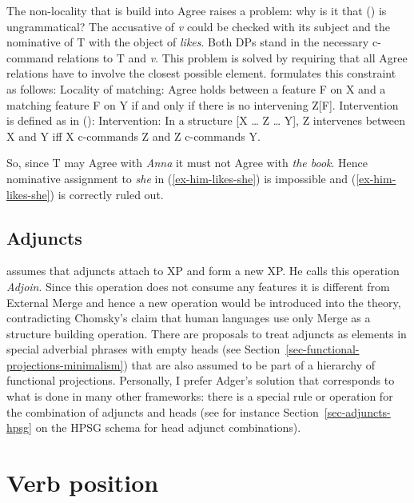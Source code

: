 The non-locality that is build into Agree raises a problem: why is it that () is
ungrammatical?
\z
The accusative of \textit{v} could be checked with its subject and the nominative of T with the
object of \emph{likes}. Both DPs stand in the necessary c-command relations to T and \textit{v}. This
problem is solved by requiring that all Agree relations have to involve the closest possible
element. \citet[]{Adger2003a} formulates this constraint as follows:
\ea
\label{principle-locality-of-matching}
Locality of matching: Agree holds between a feature F on X and a matching feature F on Y if and only
if there is no intervening Z[F].
\z
Intervention is defined as in ():
\ea
\label{def-intervention}
Intervention: In a structure [X \ldots{} Z \ldots{} Y], Z intervenes between X and Y iff X
c-commands Z and Z c-commands Y.
\z

So, since T may Agree with \emph{Anna} it must not Agree with \emph{the book}. Hence
nominative assignment to \emph{she} in (\ref{ex-him-likes-she}) is impossible and (\ref{ex-him-likes-she}) is correctly ruled out.

\subsection{Adjuncts}

\citet[Section~4.2.3]{Adger2003a} assumes that adjuncts attach to XP and form a new XP. He calls
this operation \emph{Adjoin}. Since this operation does not consume any features it is different from
External Merge and hence a new operation would be introduced into the theory, contradicting
Chomsky's claim that human languages use only Merge as a structure building operation. There are
proposals to treat adjuncts as elements in special adverbial phrases with empty heads (see
Section~\ref{sec-functional-projections-minimalism}) that are also assumed to be part of a hierarchy of functional
projections. Personally, I prefer Adger's solution that corresponds to what is done in many other
frameworks: there is a special rule or operation for the combination of adjuncts and heads (see for instance
Section~\ref{sec-adjuncts-hpsg} on the HPSG schema for head adjunct combinations).


\section{Verb position}
\label{sec-verb-position-MP}

